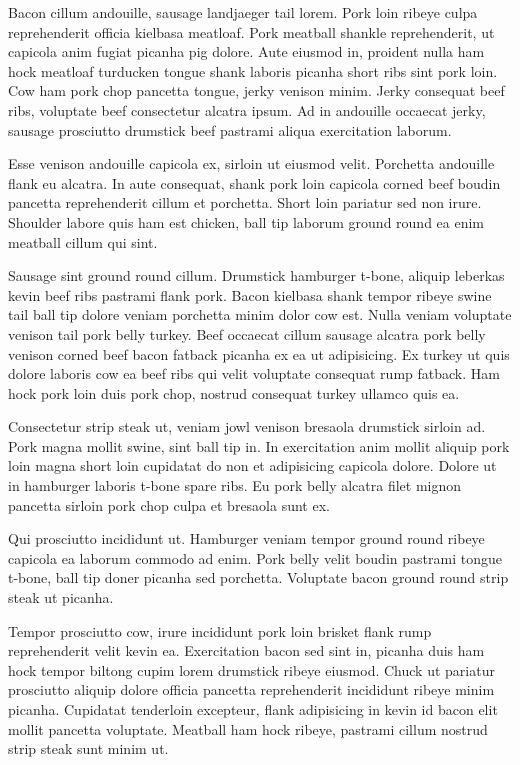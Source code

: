 Bacon cillum andouille, sausage landjaeger tail lorem. Pork loin ribeye culpa reprehenderit officia kielbasa meatloaf. Pork meatball shankle reprehenderit, ut capicola anim fugiat picanha pig dolore. Aute eiusmod in, proident nulla ham hock meatloaf turducken tongue shank laboris picanha short ribs sint pork loin. Cow ham pork chop pancetta tongue, jerky venison minim. Jerky consequat beef ribs, voluptate beef consectetur alcatra ipsum. Ad in andouille occaecat jerky, sausage prosciutto drumstick beef pastrami aliqua exercitation laborum.

Esse venison andouille capicola ex, sirloin ut eiusmod velit. Porchetta andouille flank eu alcatra. In aute consequat, shank pork loin capicola corned beef boudin pancetta reprehenderit cillum et porchetta. Short loin pariatur sed non irure. Shoulder labore quis ham est chicken, ball tip laborum ground round ea enim meatball cillum qui sint.

Sausage sint ground round cillum. Drumstick hamburger t-bone, aliquip leberkas kevin beef ribs pastrami flank pork. Bacon kielbasa shank tempor ribeye swine tail ball tip dolore veniam porchetta minim dolor cow est. Nulla veniam voluptate venison tail pork belly turkey. Beef occaecat cillum sausage alcatra pork belly venison corned beef bacon fatback picanha ex ea ut adipisicing. Ex turkey ut quis dolore laboris cow ea beef ribs qui velit voluptate consequat rump fatback. Ham hock pork loin duis pork chop, nostrud consequat turkey ullamco quis ea.

Consectetur strip steak ut, veniam jowl venison bresaola drumstick sirloin ad. Pork magna mollit swine, sint ball tip in. In exercitation anim mollit aliquip pork loin magna short loin cupidatat do non et adipisicing capicola dolore. Dolore ut in hamburger laboris t-bone spare ribs. Eu pork belly alcatra filet mignon pancetta sirloin pork chop culpa et bresaola sunt ex.

Qui prosciutto incididunt ut. Hamburger veniam tempor ground round ribeye capicola ea laborum commodo ad enim. Pork belly velit boudin pastrami tongue t-bone, ball tip doner picanha sed porchetta. Voluptate bacon ground round strip steak ut picanha.

Tempor prosciutto cow, irure incididunt pork loin brisket flank rump reprehenderit velit kevin ea. Exercitation bacon sed sint in, picanha duis ham hock tempor biltong cupim lorem drumstick ribeye eiusmod. Chuck ut pariatur prosciutto aliquip dolore officia pancetta reprehenderit incididunt ribeye minim picanha. Cupidatat tenderloin excepteur, flank adipisicing in kevin id bacon elit mollit pancetta voluptate. Meatball ham hock ribeye, pastrami cillum nostrud strip steak sunt minim ut.

